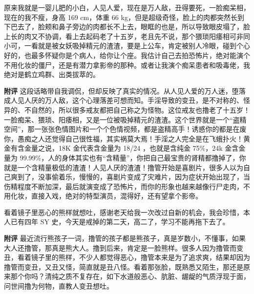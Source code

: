 \begin{case}[变丑]
    原来我就是一婴儿肥的小白，人见人爱，现在是万人敌，丑得要死，一脸痴呆相，现在的我不瘦，身高 169 \unit{\cm}，体重 66 \unit{kg}，但是超级奇怪，脸上的肉都突然长到下巴去了，脸颊和鼻子旁边的肉都长不上去，眼眶的也是，所以导致眼皮塌了，脸上长的肉又不协调，看上去起码老了十五岁，老且先不说，那个猥琐阳痿相可非同小可，一看就是被女妖吸掉精元的渣渣，要是上公车，肯定被别人冷眼，碰到个心好的，也最多怀疑你是个病人，给你让个座。我估计自己去拍恐怖片，绝对能演个不用化妆的僵尸，还是有潜力拿影帝的那种。或者让我演个痴呆患者和吸毒佬，我绝对是鹤立鸡群、出类拔萃的。

    \textbf{附评} 这段话略带自我调侃，但却反映了真实的情况。从人见人爱的万人迷，堕落成人见人厌的万人敌，这个心理落差可想而知。手淫导致的变丑，是不对称的、怪异的、不自然的，所以很多戒友都把自己称之为怪物。这位戒友也撸老了十五岁！一脸痴呆、猥琐、阳痿相，又是一位被吸掉精元的渣渣。这个世界就是一个“盗精空间”，那一张张色情图片和一个个色情视频，都是盗精高手！诱惑你的都是在废你，愚痴之人还觉得自己很性福，其实祸莫大焉！手淫之人完全是在飞蛾扑火！黄金有含金量之说，18K 金代表含金量为 18/24 ，也就是含纯金 75\%，24k 金含金量为 99.99\%，人的身体其实也有“含精量”，你把自己最宝贵的肾精都撸掉了，你就是一个含精量极低的渣渣！人见人厌的渣渣！撸管开始是喜剧片，很多人以为自己爽到了，没事偷着乐，慢慢的，喜剧片变成了灾难片，因为症状开始出现了，当伤精程度不断加深，最后就演变成了恐怖片，而你的形象也越来越像行尸走肉，不用化妆，直接入戏，绝对的特型演员，混得好，还有望拿个影帝。
\end{case}

\begin{case}[变丑]
    看着镜子里恶心的熊样就想吐，感谢老天给我一次改过自新的机会，我会珍惜，本人已有四年 SY 史，今天是戒掉的第二天，高二了，学习不能再拖下去了。

    \textbf{附评} 最近流行熊孩子一词，撸管的孩子都是熊孩子，真是岁数小，不懂事，如果大人还撸管，那真是熊大人。撸到后来，肯定是一脸熊样。很多人因为撸管而变丑，看着镜子里的熊样，不少人都觉得恶心，撸管本来是为了追求爽，结果却因为撸管而变丑，又丑又怪，简直就是丑八怪。看着那张脸，既熟悉又陌生，那还是原来那个你吗？清纯之质不复存在，如下水道般恶心、肮脏、龌龊的气质浮现于面，问世间撸为何物，直教人变丑想吐。
\end{case}

